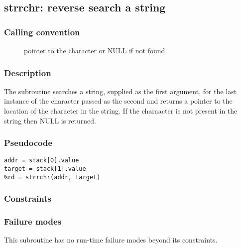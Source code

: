 \clearpage
{}
{}
\label{subr:strrchr}
\subsection*{strrchr: reverse search a string}

\subsubsection*{Calling convention}

\begin{description}
\item[] pointer to the character or NULL if not found
\end{description}

\subsubsection*{Description}

The  subroutine searches a string, supplied as the
first argument, for the last instance of the character passed as the
second and returns a pointer to the location of the character in the
string.  If the charaacter is not present in the string then NULL is
returned.

\subsubsection*{Pseudocode}

\begin{verbatim}
addr = stack[0].value
target = stack[1].value
%rd = strrchr(addr, target)
\end{verbatim}

\subsubsection*{Constraints}

\subsubsection*{Failure modes}

This subroutine has no run-time failure modes beyond its constraints.
